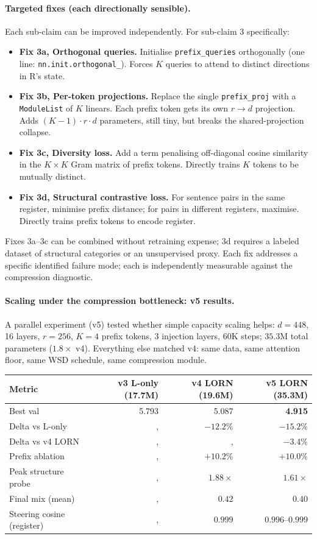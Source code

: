 \documentclass[11pt, a4paper]{article}
\theoremstyle{plain}
\theoremstyle{definition}
\theoremstyle{remark}
\begin{document}
\paragraph{Targeted fixes (each directionally sensible).}
Each sub-claim can be improved independently.
For sub-claim 3 specifically:
\begin{itemize}[nosep]
\item \textbf{Fix 3a, Orthogonal queries.} Initialise \texttt{prefix\_queries} orthogonally (one line: \texttt{nn.init.orthogonal\_}). Forces $K$ queries to attend to distinct directions in R's state.
\item \textbf{Fix 3b, Per-token projections.} Replace the single \texttt{prefix\_proj} with a \texttt{ModuleList} of $K$ linears. Each prefix token gets its own $r \to d$ projection. Adds $(K-1) \cdot r \cdot d$ parameters, still tiny, but breaks the shared-projection collapse.
\item \textbf{Fix 3c, Diversity loss.} Add a term penalising off-diagonal cosine similarity in the $K \times K$ Gram matrix of prefix tokens. Directly trains $K$ tokens to be mutually distinct.
\item \textbf{Fix 3d, Structural contrastive loss.} For sentence pairs in the same register, minimise prefix distance; for pairs in different registers, maximise. Directly trains prefix tokens to encode register.
\end{itemize}
Fixes 3a--3c can be combined without retraining expense; 3d requires a labeled dataset of structural categories or an unsupervised proxy.
Each fix addresses a specific identified failure mode; each is independently measurable against the compression diagnostic.

\paragraph{Scaling under the compression bottleneck: v5 results.}
A parallel experiment (v5) tested whether simple capacity scaling helps: $d{=}448$, 16 layers, $r{=}256$, $K{=}4$ prefix tokens, 3 injection layers, 60K steps; $35.3$M total parameters ($1.8\times$ v4).
Everything else matched v4: same data, same attention floor, same WSD schedule, same compression module.

\begin{center}
\begin{tabular}{lrrr}
\toprule
Metric & v3 L-only (17.7M) & v4 LORN (19.6M) & v5 LORN (35.3M) \\
\midrule
Best val & 5.793 & 5.087 & \textbf{4.915} \\
Delta vs L-only & ,  & $-12.2\%$ & $-15.2\%$ \\
Delta vs v4 LORN & ,  & ,  & $-3.4\%$ \\
Prefix ablation & ,  & $+10.2\%$ & $+10.0\%$ \\
Peak structure probe & ,  & $1.88\times$ & $1.61\times$ \\
Final mix (mean) & ,  & $0.42$ & $0.40$ \\
Steering cosine (register) & ,  & $0.999$ & $0.996$--$0.999$ \\
\bottomrule
\end{tabular}
\end{center}
\end{document}
